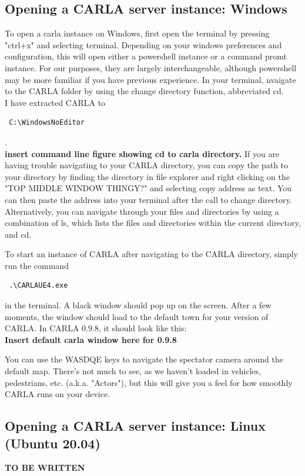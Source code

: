 \documentclass[12pt,oneside,letterpaper]{article}
\begin{document}
\subsection{Opening a CARLA server instance: Windows}
\label{sec:CARLAserverwindows}
To open a carla instance on Windows, first open the terminal by pressing "ctrl+x" and selecting terminal. Depending on your windows preferences and configuration, this will open either a powershell instance or a command promt instance. For our purposes, they are largely interchangeable, although powershell may be more familiar if you have previous experience. In your terminal, nvaigate to the CARLA folder by using the change directory function, abbreviated cd. 
\\
I have extracted CARLA to \begin{verbatim} C:\WindowsNoEditor \end{verbatim}.
\\
 \textbf{insert command line figure showing cd to carla directory.}
If you are having trouble navigating to your CARLA directory, you can copy the path to your directory by finding the directory in file explorer and  right clicking on the "TOP MIDDLE WINDOW THINGY?" and selecting copy address as text. You can then paste the address into your terminal after the call to change directory.
Alternatively, you can navigate through your files and directories by using a combination of ls, which lists the files and directories within the current directory, and cd. 

To start an instance of CARLA after navigating to the CARLA directory, simply run the command \begin{verbatim} .\CARLAUE4.exe \end{verbatim} in the terminal. A black window should pop up on the screen. After a few moments, the window should load to the default town for your version of CARLA. In CARLA 0.9.8, it should look like this:
\\ 
\textbf{Insert default carla window here for 0.9.8}

You can use the WASDQE keys to navigate the spectator camera around the default map. There's not much to see, as we haven't loaded in vehicles, pedestrians, etc. (a.k.a. "Actors"), but this will give you a feel for how smoothly CARLA runs on your device.
\subsection{Opening a CARLA server instance: Linux (Ubuntu 20.04)}
 \textbf{TO BE WRITTEN}
\end{document}
